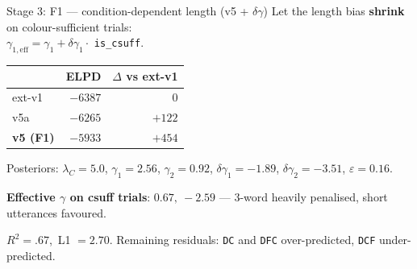 \documentclass[10pt,aspectratio=169]{beamer}
\newcommand{\main}[1]{\textcolor{CSP-main-dark}{\textbf{#1}}}
\begin{document}
\begin{frame}{Stage 3: F1 --- condition-dependent length (v5 + $\delta\gamma$)}
Let the length bias \main{shrink} on colour-sufficient trials:\\
$\gamma_{1,\mathrm{eff}} = \gamma_1 + \delta\gamma_1 \cdot$ \texttt{is\_csuff}.

\vspace{0.5em}
\begin{center}
\begin{tabular}{lrr}
\toprule
& ELPD & $\Delta$ vs ext-v1\\
\midrule
ext-v1 & $-6387$ & 0 \\
v5a    & $-6265$ & $+122$ \\
\main{v5 (F1)} & \main{$-5933$} & \main{$+454$} \\
\bottomrule
\end{tabular}
\end{center}

\vspace{0.5em}
\footnotesize Posteriors: $\lambda_C = 5.0$, $\gamma_1 = 2.56$, $\gamma_2 = 0.92$, $\delta\gamma_1 = -1.89$, $\delta\gamma_2 = -3.51$, $\varepsilon = 0.16$.

\vspace{0.3em}
\footnotesize \main{Effective $\gamma$ on csuff trials}: $0.67,\ -2.59$ --- 3-word heavily penalised, short utterances favoured.

\vspace{0.4em}
\small $R^2 = .67$,\ L1 $= 2.70$.\quad
Remaining residuals: \texttt{DC} and \texttt{DFC} over-predicted, \texttt{DCF} under-predicted.
\end{frame}
\end{document}
